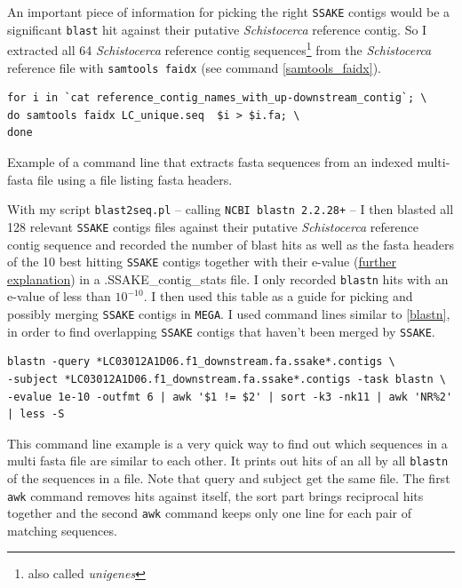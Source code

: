 \documentclass[a4paper,12pt,times,print,index, custombib]{PhDThesisPSnPDF}\usepackage[]{graphicx}\usepackage[]{color}
\begin{document}
An important piece of information for picking the right \texttt{SSAKE} contigs would be a significant \texttt{blast} hit against their putative \textit{Schistocerca} reference contig. So I extracted all 64 \textit{Schistocerca} reference contig sequences\footnote{also called \emph{unigenes}} from the \textit{Schistocerca} reference file with \texttt{samtools faidx} (see command \ref{samtools_faidx}).

\begin{cmd}
\captionsetup{type=cmd}
\begin{Verbatim}[fontsize=\scriptsize, formatcom=\color{darkgray}]
for i in `cat reference_contig_names_with_up-downstream_contig`; \
do samtools faidx LC_unique.seq  $i > $i.fa; \
done
\end{Verbatim}
\caption{\small Example of a command line that extracts fasta sequences from an indexed multi-fasta file using a file listing fasta headers.}
\label{samtools_faidx}
\end{cmd}

With my script \texttt{blast2seq.pl} -- calling \texttt{NCBI blastn 2.2.28+} \citep{Camacho2009} -- I then blasted all 128 relevant \texttt{SSAKE} contigs files against their putative \textit{Schistocerca} reference contig sequence and recorded the number of blast hits as well as the fasta headers of the 10 best hitting \texttt{SSAKE} contigs together with their \gls{e-value} (\href{http://blast.ncbi.nlm.nih.gov/Blast.cgi?CMD=Web&PAGE_TYPE=BlastDocs&DOC_TYPE=FAQ#expect}{further explanation}) in a \textsf{.SSAKE\_contig\_stats} file. I only recorded \texttt{blastn} hits with an \gls{e-value} of less than $10^{-10}$. I then used this table as a guide for picking and possibly merging \texttt{SSAKE} contigs in \texttt{MEGA}. I used command lines similar to \ref{blastn}, in order to find overlapping \texttt{SSAKE} contigs that haven't been merged by \texttt{SSAKE}.

\begin{cmd}
\captionsetup{type=cmd}
\begin{Verbatim}[fontsize=\scriptsize, formatcom=\color{darkgray}]
blastn -query *LC03012A1D06.f1_downstream.fa.ssake*.contigs \
-subject *LC03012A1D06.f1_downstream.fa.ssake*.contigs -task blastn \
-evalue 1e-10 -outfmt 6 | awk '$1 != $2' | sort -k3 -nk11 | awk 'NR%2' | less -S
\end{Verbatim}
\caption{\small This command line example is a very quick way to find out which sequences in a multi fasta file are similar to each other. It prints out hits of an all by all \texttt{blastn} of the sequences in a file. Note that query and subject get the same file. The first \texttt{awk} command removes hits against itself, the sort part brings reciprocal hits together and the second \texttt{awk} command keeps only one line for each pair of matching sequences.}
\label{blastn}
\end{cmd}
\end{document}
